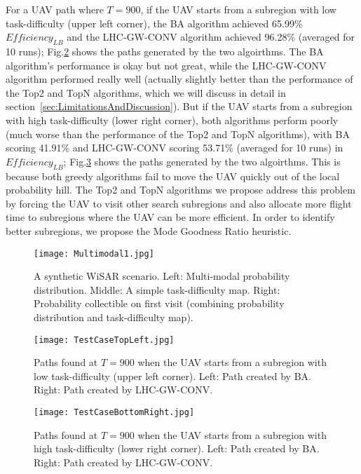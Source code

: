 For a UAV path where $T=900$, if the UAV starts from a subregion with low task-difficulty (upper left corner), the BA algorithm achieved 65.99\% $\mathit{Efficiency_{LB}}$ and the LHC-GW-CONV algorithm achieved 96.28\% (averaged for 10 runs); Fig.\ref{SyntheticCasePaths1} shows the paths generated by the two algoirthms. The BA algorithm's performance is okay but not great, while the LHC-GW-CONV algorithm performed really well (actually slightly better than the performance of the Top2 and TopN algorithms, which we will discuss in detail in section~\ref{sec:LimitationsAndDiscussion}). But if the UAV starts from a subregion with high task-difficulty (lower right corner), both algorithms perform poorly (much worse than the performance of the Top2 and TopN algorithms), with BA scoring 41.91\% and LHC-GW-CONV scoring 53.71\% (averaged for 10 runs) in $\mathit{Efficiency_{LB}}$; Fig.\ref{SyntheticCasePaths2} shows the paths generated by the two algoirthms. This is because both greedy algorithms fail to move the UAV quickly out of the local probability hill. The Top2 and TopN algorithms we propose address this problem by forcing the UAV to visit other search subregions and also allocate more flight time to subregions where the UAV can be more efficient. In order to identify better subregions, we propose the Mode Goodness Ratio heuristic.
\begin{figure}
\centering
\texttt{[image: Multimodal1.jpg]}
\caption{A synthetic WiSAR scenario. Left: Multi-modal probability distribution. Middle: A simple task-difficulty map. Right: Probability collectible on first visit (combining probability distribution and task-difficulty map).}
\label{SyntheticCase}
\end{figure}

\begin{figure}
\centering
\texttt{[image: TestCaseTopLeft.jpg]}
\caption{Paths found at $T=900$ when the UAV starts from a subregion with low task-difficulty (upper left corner). Left: Path created by BA. Right: Path created by LHC-GW-CONV.}
\label{SyntheticCasePaths1}
\end{figure}

\begin{figure}
\centering
\texttt{[image: TestCaseBottomRight.jpg]}
\caption{Paths found at $T=900$ when the UAV starts from a subregion with high task-difficulty (lower right corner). Left: Path created by BA. Right: Path created by LHC-GW-CONV.}
\label{SyntheticCasePaths2}
\end{figure}

